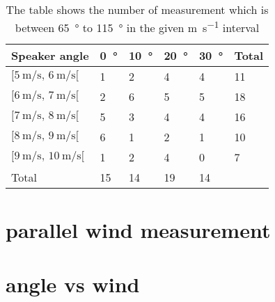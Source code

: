 \begin{table}[]
\centering
\caption{The table shows the number of measurement which is between \SI{65}{\degree} to \SI{115}{\degree} in the given \si{\meter\per\second} interval}
\begin{tabular}{l|l|l|l|l|l}
Speaker angle & \SI{0}{\degree}  & \SI{10}{\degree} & \SI{20}{\degree} & \SI{30}{\degree} & Total \\ \hline
$[\SI{5}{\meter\per\second},\, \SI{6}{\meter\per\second}[ $         & 1  & 2  & 4  & 4  & 11    \\
$[\SI{6}{\meter\per\second},\, \SI{7}{\meter\per\second}[$           & 2  & 6  & 5  & 5  & 18    \\
$[\SI{7}{\meter\per\second},\, \SI{8}{\meter\per\second}[ $          & 5  & 3  & 4  & 4  & 16    \\
$[\SI{8}{\meter\per\second},\, \SI{9}{\meter\per\second}[ $          & 6  & 1  & 2  & 1  & 10    \\
$[\SI{9}{\meter\per\second},\, \SI{10}{\meter\per\second}[  $        & 1  & 2  & 4  & 0  & 7     \\ \hline
Total         & 15 & 14 & 19 & 14 &      
\end{tabular}
\label{ta:meas:approved_measurement}
\end{table}



\section{parallel wind measurement}\label{mes:kudo:par_mes}

\section{angle vs wind}\label{mes:kudo:relaton}